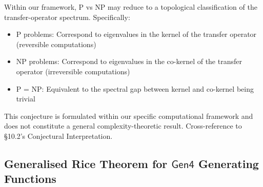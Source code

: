 \begin{notation}
\label{not:interpretive-heuristics}
\begin{conjecture}
\label{conj:p-vs-np-spectrum}
Within our framework, P vs NP may reduce to a topological classification of the transfer-operator spectrum. Specifically:
\begin{itemize}
\item P problems: Correspond to eigenvalues in the kernel of the transfer operator (reversible computations)
\item NP problems: Correspond to eigenvalues in the co-kernel of the transfer operator (irreversible computations)
\item P = NP: Equivalent to the spectral gap between kernel and co-kernel being trivial
\end{itemize}
This conjecture is formulated within our specific computational framework and does not constitute a general complexity-theoretic result. Cross-reference to §10.2's Conjectural Interpretation.
\end{conjecture}
\end{notation}

\subsection{Generalised Rice Theorem for $\mathsf{Gen4}$ Generating Functions}

